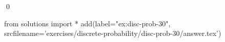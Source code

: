 
\begin{ex} 
  \label{ex:disc-prob-30}
  
  \qed
\end{ex} 
\begin{python0}
from solutions import *
add(label="ex:disc-prob-30",
    srcfilename='exercises/discrete-probability/disc-prob-30/answer.tex') 
\end{python0}
